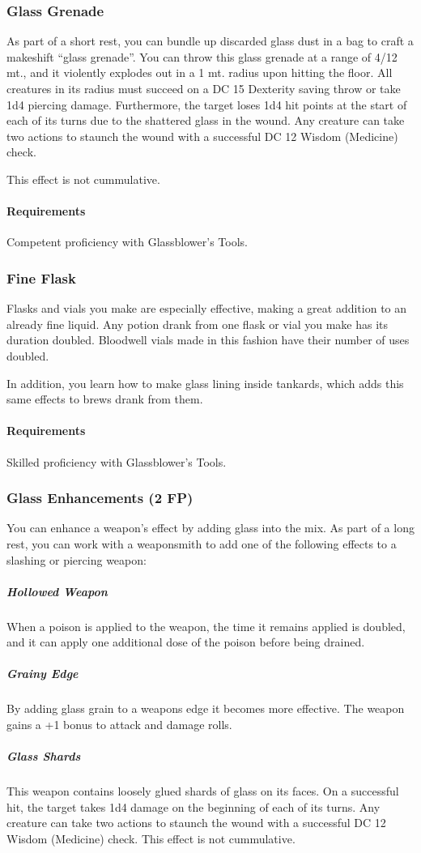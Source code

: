 \subsubsection{Glass Grenade} \label{feat::glassgrenade}
    As part of a short rest, you can bundle up discarded glass dust in a bag to craft a makeshift ``glass grenade''.
    You can throw this glass grenade at a range of 4/12 mt., and it violently explodes out in a 1 mt. radius upon hitting the floor.
    All creatures in its radius must succeed on a DC 15 Dexterity saving throw or take 1d4 piercing damage.
    Furthermore, the target loses 1d4 hit points at the start of each of its turns due to the shattered glass in the wound.
    Any creature can take two actions to staunch the wound with a successful DC 12 Wisdom (Medicine) check.

    This effect is not cummulative.
    \paragraph{Requirements} Competent proficiency with Glassblower's Tools.
\subsubsection{Fine Flask} \label{feat::fineflask}
    Flasks and vials you make are especially effective, making a great addition to an already fine liquid.
    Any potion drank from one flask or vial you make has its duration doubled.
    Bloodwell vials made in this fashion have their number of uses doubled.

    In addition, you learn how to make glass lining inside tankards, which adds this same effects to brews drank from them.
    \paragraph{Requirements} Skilled proficiency with Glassblower's Tools.
\subsubsection{Glass Enhancements (2 FP)} \label{feat::glassenhancement}
    You can enhance a weapon's effect by adding glass into the mix.
    As part of a long rest, you can work with a weaponsmith to add one of the following effects to a slashing or piercing weapon:
    \subparagraph{Hollowed Weapon} When a poison is applied to the weapon, the time it remains applied is doubled, and it can apply one additional dose of the poison before being drained.
    \subparagraph{Grainy Edge} By adding glass grain to a weapons edge it becomes more effective.
    The weapon gains a +1 bonus to attack and damage rolls.
    \subparagraph{Glass Shards} This weapon contains loosely glued shards of glass on its faces.
    On a successful hit, the target takes 1d4 damage on the beginning of each of its turns.
    Any creature can take two actions to staunch the wound with a successful DC 12 Wisdom (Medicine) check.
    This effect is not cummulative.

